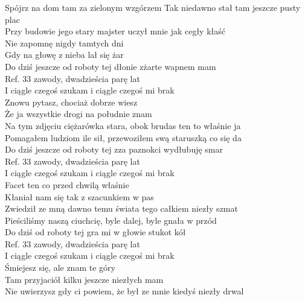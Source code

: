 
\begin{flushleft}
Spójrz na dom tam za zielonym wzgórzem \tab{}  \newline
Tak niedawno stał tam jeszcze pusty plac \tab{}\\
Przy budowie jego stary majster uczył mnie jak cegły kłaść \\
Nie zapomnę nigdy tamtych dni \tab{} \\
Gdy na głowę z nieba lał się żar \tab{}\\
Do dziś jeszcze od roboty tej dłonie zżarte wapnem mam \\
\vskip 3mm
Ref. 33 zawody, dwadzieścia parę lat \tab{}\\
\hspace{0.9cm}I ciągle czegoś szukam i ciągle czegoś mi brak \\
\vskip 3mm
Znowu pytasz, chociaż dobrze wiesz\\
Że ja wszystkie drogi na południe znam\\
Na tym zdjęciu ciężarówka stara, obok brudas ten to właśnie ja\\
Pomagałem ludziom ile sił, przewoziłem swą staruszką co się da\\
Do dziś jeszcze od roboty tej zza paznokci wydłubuję smar\\
\vskip 3mm
Ref. 33 zawody, dwadzieścia parę lat\\
\hspace{0.9cm}I ciągle czegoś szukam i ciągle czegoś mi brak\\
\vskip 3mm
Facet ten co przed chwilą właśnie\\
Kłaniał nam się tak z szacunkiem w pas\\
Zwiedził ze mną dawno temu świata tego całkiem niezły szmat\\
Pieściliśmy naszą ciuchcię, byle dalej, byle gnała w przód\\
Do dziś od roboty tej gra mi w głowie stukot kół\\
\vskip 3mm
Ref. 33 zawody, dwadzieścia parę lat\\
\hspace{0.9cm}I ciągle czegoś szukam i ciągle czegoś mi brak\\
\vskip 3mm
Śmiejesz się, ale znam te góry\\
Tam przyjaciół kilku jeszcze niezłych mam\\
Nie uwierzysz gdy ci powiem, że był ze mnie kiedyś niezły drwal\\

\end{flushleft}
